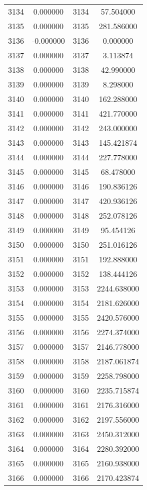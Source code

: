 \documentclass[12pt]{article}
\begin{document}
\begin{longtable}{@{}cccc@{}}
3134 & 0.000000 & 3134 & 57.504000 \\
3135 & 0.000000 & 3135 & 281.586000 \\
3136 & -0.000000 & 3136 & 0.000000 \\
3137 & 0.000000 & 3137 & 3.113874 \\
3138 & 0.000000 & 3138 & 42.990000 \\
3139 & 0.000000 & 3139 & 8.298000 \\
3140 & 0.000000 & 3140 & 162.288000 \\
3141 & 0.000000 & 3141 & 421.770000 \\
3142 & 0.000000 & 3142 & 243.000000 \\
3143 & 0.000000 & 3143 & 145.421874 \\
3144 & 0.000000 & 3144 & 227.778000 \\
3145 & 0.000000 & 3145 & 68.478000 \\
3146 & 0.000000 & 3146 & 190.836126 \\
3147 & 0.000000 & 3147 & 420.936126 \\
3148 & 0.000000 & 3148 & 252.078126 \\
3149 & 0.000000 & 3149 & 95.454126 \\
3150 & 0.000000 & 3150 & 251.016126 \\
3151 & 0.000000 & 3151 & 192.888000 \\
3152 & 0.000000 & 3152 & 138.444126 \\
3153 & 0.000000 & 3153 & 2244.638000 \\
3154 & 0.000000 & 3154 & 2181.626000 \\
3155 & 0.000000 & 3155 & 2420.576000 \\
3156 & 0.000000 & 3156 & 2274.374000 \\
3157 & 0.000000 & 3157 & 2146.778000 \\
3158 & 0.000000 & 3158 & 2187.061874 \\
3159 & 0.000000 & 3159 & 2258.798000 \\
3160 & 0.000000 & 3160 & 2235.715874 \\
3161 & 0.000000 & 3161 & 2176.316000 \\
3162 & 0.000000 & 3162 & 2197.556000 \\
3163 & 0.000000 & 3163 & 2450.312000 \\
3164 & 0.000000 & 3164 & 2280.392000 \\
3165 & 0.000000 & 3165 & 2160.938000 \\
3166 & 0.000000 & 3166 & 2170.423874 \\

\end{longtable}
\end{document}
